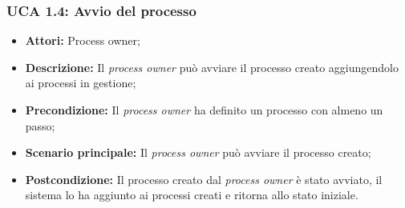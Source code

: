 \hypertarget{A1.4}{}
\subsubsection{UCA 1.4: Avvio del processo}
\begin{itemize}
\item \textbf{Attori:} Process owner;
\item \textbf{Descrizione:}
Il \textit{process owner} può avviare il processo creato aggiungendolo ai processi in gestione;
\item \textbf{Precondizione:}
Il \textit{process owner} ha definito un processo con almeno un passo;
\item \textbf{Scenario principale:}
Il \textit{process owner} può avviare il processo creato;
\item \textbf{Postcondizione:}
Il processo creato dal \textit{process owner} è stato avviato, il sistema lo ha aggiunto ai processi creati e ritorna allo stato iniziale.
\end{itemize}

\hypertarget{A2}{}

